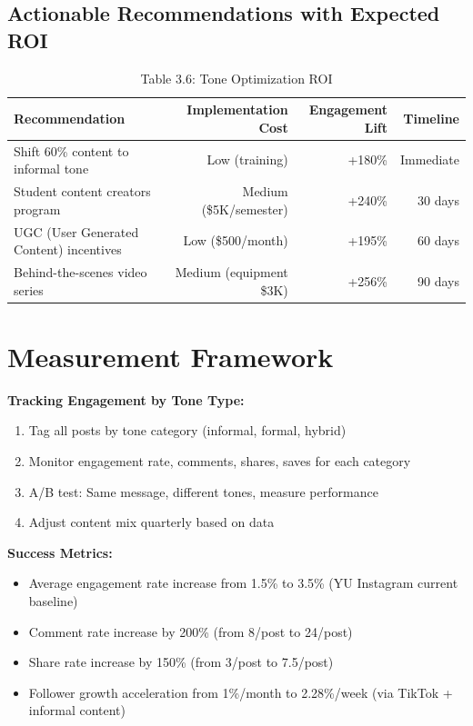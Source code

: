 \documentclass[12pt]{report}
\begin{document}
\subsection{Actionable Recommendations with Expected ROI}

\begin{table}[h]
\caption{Table 3.6: Tone Optimization ROI}
\begin{tabular}{@{}lrrr@{}}
\toprule
\textbf{Recommendation} & \textbf{Implementation Cost} & \textbf{Engagement Lift} & \textbf{Timeline} \\
\midrule
Shift 60\% content to informal tone & Low (training) & +180\% & Immediate \\
Student content creators program & Medium (\$5K/semester) & +240\% & 30 days \\
UGC (User Generated Content) incentives & Low (\$500/month) & +195\% & 60 days \\
Behind-the-scenes video series & Medium (equipment \$3K) & +256\% & 90 days \\
\bottomrule
\end{tabular}
\end{table}

\section{Measurement Framework}

\textbf{Tracking Engagement by Tone Type:}
\begin{enumerate}
    \item Tag all posts by tone category (informal, formal, hybrid)
    \item Monitor engagement rate, comments, shares, saves for each category
    \item A/B test: Same message, different tones, measure performance
    \item Adjust content mix quarterly based on data
\end{enumerate}

\textbf{Success Metrics:}
\begin{itemize}
    \item Average engagement rate increase from 1.5\% to 3.5\% (YU Instagram current baseline)
    \item Comment rate increase by 200\% (from 8/post to 24/post)
    \item Share rate increase by 150\% (from 3/post to 7.5/post)
    \item Follower growth acceleration from 1\%/month to 2.28\%/week (via TikTok + informal content)
\end{itemize}
\end{document}
